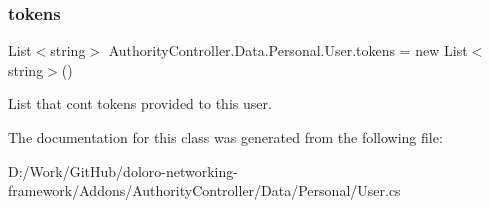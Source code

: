 \mbox{\label{class_authority_controller_1_1_data_1_1_personal_1_1_user_a2d4cda1ba0e47546cc1d1b2c5db82434}} 
\subsubsection{\texorpdfstring{tokens}{tokens}}
{\footnotesize\ttfamily List$<$string$>$ Authority\+Controller.\+Data.\+Personal.\+User.\+tokens = new List$<$string$>$()}



List that cont tokens provided to this user. 



The documentation for this class was generated from the following file\+:\begin{DoxyCompactItemize}
\item 
D\+:/\+Work/\+Git\+Hub/doloro-\/networking-\/framework/\+Addons/\+Authority\+Controller/\+Data/\+Personal/User.\+cs\end{DoxyCompactItemize}
